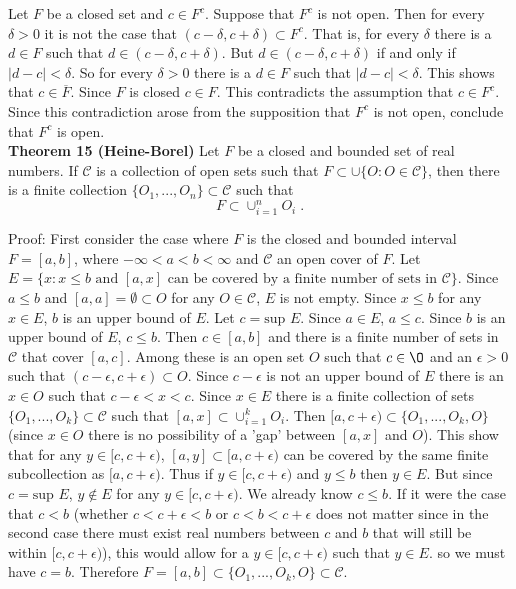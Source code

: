 \documentclass[a4paper]{article}
\begin{document}
Let $F$ be a closed set and $c \in F^c$. Suppose that $F^c$ is not open. Then for every $\delta>0$ it is not the case that $(c-\delta, c+\delta) \subset F^c$. That is, for every $\delta$ there is a $d \in F$ such that $d \in (c-\delta, c+ \delta)$. But $d \in  (c-\delta, c+ \delta)$ if and only if $|d - c| < \delta$. So for every $\delta >0$ there is a $d \in F$ such that $|d-c| < \delta$. This shows that $c \in \overline{F}$. Since $F$ is closed $c \in F$. This contradicts the assumption that $c \in F^c$. Since this contradiction arose from the supposition that $F^c$ is not open, conclude that $F^c$ is open. \\

{\bf Theorem 15 (Heine-Borel)} Let $F$ be a closed and bounded set of real numbers. If $\mathcal{C}$ is a collection of open sets such that $F \subset \cup\{O : O \in \mathcal{C}\}$, then there is a finite collection $\{O_1, ... ,O_n\}\subset \mathcal{C}$ such that $$F \subset \cup_{i=1}^n O_i \;.$$

Proof: First consider the case where $F$ is the closed and bounded interval $F = [a,b]$, where $-\infty < a<b<\infty$ and $\mathcal{C}$ an open cover of $F$. Let $E = \{x : x\leq b \text{ and } [a,x] \text{ can be covered by a finite}$ $\text{number of sets in } \mathcal{C}\}$. Since $a\leq b$ and $[a,a] = \emptyset \subset O$ for any $O \in \mathcal{C}$, $E$ is not empty. Since $x\leq b$ for any $x \in E$, $b$ is an upper bound of $E$. Let $c = \text{sup }E$. Since $a \in E$, $a\leq c$. Since $b$ is an upper bound of $E$, $c\leq b$. Then $c \in [a,b]$ and there is a finite number of sets in $\mathcal{C}$ that cover $[a,c]$. Among these is an open set $O$ such that $c \in \O$ and an $\epsilon > 0 $ such that $(c-\epsilon, c+ \epsilon) \subset O$. Since $c-\epsilon$ is not an upper bound of $E$ there is an $x \in O$ such that $c-\epsilon<x<c$. Since $x \in E$ there is a finite collection of sets $\{O_1,...,O_k\} \subset \mathcal{C}$  such that $[a,x] \subset \cup_{i=1}^k O_i$. Then $[a,c+\epsilon) \subset \{O_1,...,O_k, O\}$ (since $x \in O$ there is no possibility of a 'gap' between $[a,x]$ and $O$). This show that for any $y \in [c,c+\epsilon)$, $[a,y]\subset [a,c+\epsilon)$ can be covered by the same finite subcollection as $[a,c+\epsilon)$. Thus if $y\in [c,c+\epsilon)$ and $y\leq b$ then $y \in E$. But since $c = \text{sup }E$, $y \not \in E$ for any $y \in [c,c+\epsilon)$. We already know $c\leq b$. If it were the case that $c<b$ (whether $c<c+\epsilon<b$ or $c<b<c+\epsilon$ does not matter since in the second case there must exist real numbers between $c$ and $b$ that will still be within $[c,c+\epsilon)$), this would allow for a $y \in [c,c+\epsilon)$ such that $y \in E$. so we must have $c = b$. Therefore $F = [a,b] \subset \{O_1,...,O_k,O\} \subset \mathcal{C}$.\\
\end{document}
